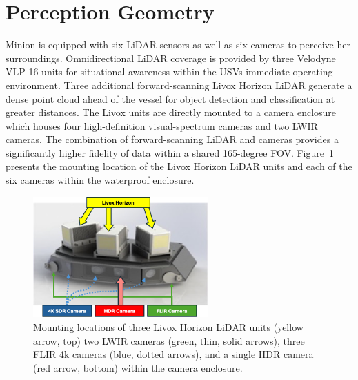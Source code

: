 \documentclass{erauthesis}
\begin{document}
\section{Perception Geometry} \label{perception_geometry}

Minion is equipped with six \ac{LiDAR} sensors as well as six cameras to perceive her surroundings.
Omnidirectional \ac{LiDAR} coverage is provided by three Velodyne VLP-16 units for situational awareness within the \acp{USV} immediate operating environment.
Three additional forward-scanning Livox Horizon \ac{LiDAR} generate a dense point cloud ahead of the vessel for object detection and classification at greater distances.
The Livox units are directly mounted to a camera enclosure which houses four high-definition visual-spectrum cameras and two \ac{LWIR} cameras.
The combination of forward-scanning LiDAR and cameras provides a significantly higher fidelity of data within a shared 165-degree \ac{FOV}.%
Figure~\ref{fig:camera_enclosure} presents the mounting location of the Livox Horizon LiDAR units and each of the six cameras within the waterproof enclosure. 

\begin{figure}[htbp]
\centering
\includegraphics[width=0.6\textwidth]{Images/Camera_enclosure2.png}
\caption{Mounting locations of three Livox Horizon LiDAR units (yellow arrow, top) two LWIR cameras (green, thin, solid arrows), three FLIR 4k cameras (blue, dotted arrows), and a single \ac{HDR} camera  (red arrow, bottom) within the camera enclosure.}
\label{fig:camera_enclosure}
\end{figure}
\end{document}
